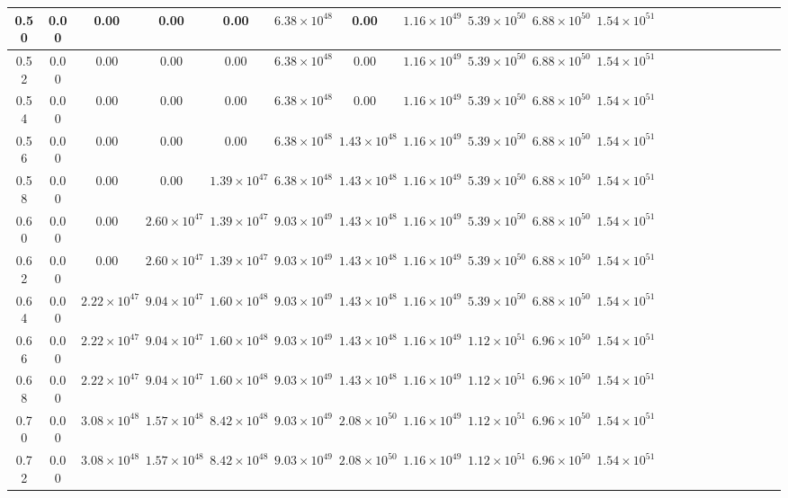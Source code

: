 \begin{table*}
\begin{tabular}{ccccccccccccccccccccc}
\hline
0.50  &0.00 &0.00 &0.00 &0.00 &$6.38\times 10^{48}$ &0.00 &$1.16\times 10^{49}$ &$5.39\times 10^{50}$ &$6.88\times 10^{50}$ &$1.54\times 10^{51}$ \\
\hline
0.52  &0.00 &0.00 &0.00 &0.00 &$6.38\times 10^{48}$ &0.00 &$1.16\times 10^{49}$ &$5.39\times 10^{50}$ &$6.88\times 10^{50}$ &$1.54\times 10^{51}$ \\
\hline
0.54  &0.00 &0.00 &0.00 &0.00 &$6.38\times 10^{48}$ &0.00 &$1.16\times 10^{49}$ &$5.39\times 10^{50}$ &$6.88\times 10^{50}$ &$1.54\times 10^{51}$ \\
\hline
0.56  &0.00 &0.00 &0.00 &0.00 &$6.38\times 10^{48}$ &$1.43\times 10^{48}$ &$1.16\times 10^{49}$ &$5.39\times 10^{50}$ &$6.88\times 10^{50}$ &$1.54\times 10^{51}$ \\
\hline
0.58  &0.00 &0.00 &0.00 &$1.39\times 10^{47}$ &$6.38\times 10^{48}$ &$1.43\times 10^{48}$ &$1.16\times 10^{49}$ &$5.39\times 10^{50}$ &$6.88\times 10^{50}$ &$1.54\times 10^{51}$ \\
\hline
0.60  &0.00 &0.00 &$2.60\times 10^{47}$ &$1.39\times 10^{47}$ &$9.03\times 10^{49}$ &$1.43\times 10^{48}$ &$1.16\times 10^{49}$ &$5.39\times 10^{50}$ &$6.88\times 10^{50}$ &$1.54\times 10^{51}$ \\
\hline
0.62  &0.00 &0.00 &$2.60\times 10^{47}$ &$1.39\times 10^{47}$ &$9.03\times 10^{49}$ &$1.43\times 10^{48}$ &$1.16\times 10^{49}$ &$5.39\times 10^{50}$ &$6.88\times 10^{50}$ &$1.54\times 10^{51}$ \\
\hline
0.64  &0.00 &$2.22\times 10^{47}$ &$9.04\times 10^{47}$ &$1.60\times 10^{48}$ &$9.03\times 10^{49}$ &$1.43\times 10^{48}$ &$1.16\times 10^{49}$ &$5.39\times 10^{50}$ &$6.88\times 10^{50}$ &$1.54\times 10^{51}$ \\
\hline
0.66  &0.00 &$2.22\times 10^{47}$ &$9.04\times 10^{47}$ &$1.60\times 10^{48}$ &$9.03\times 10^{49}$ &$1.43\times 10^{48}$ &$1.16\times 10^{49}$ &$1.12\times 10^{51}$ &$6.96\times 10^{50}$ &$1.54\times 10^{51}$ \\
\hline
0.68  &0.00 &$2.22\times 10^{47}$ &$9.04\times 10^{47}$ &$1.60\times 10^{48}$ &$9.03\times 10^{49}$ &$1.43\times 10^{48}$ &$1.16\times 10^{49}$ &$1.12\times 10^{51}$ &$6.96\times 10^{50}$ &$1.54\times 10^{51}$ \\
\hline
0.70  &0.00 &$3.08\times 10^{48}$ &$1.57\times 10^{48}$ &$8.42\times 10^{48}$ &$9.03\times 10^{49}$ &$2.08\times 10^{50}$ &$1.16\times 10^{49}$ &$1.12\times 10^{51}$ &$6.96\times 10^{50}$ &$1.54\times 10^{51}$ \\
\hline
0.72  &0.00 &$3.08\times 10^{48}$ &$1.57\times 10^{48}$ &$8.42\times 10^{48}$ &$9.03\times 10^{49}$ &$2.08\times 10^{50}$ &$1.16\times 10^{49}$ &$1.12\times 10^{51}$ &$6.96\times 10^{50}$ &$1.54\times 10^{51}$ \\

\end{tabular}
\end{table*}
